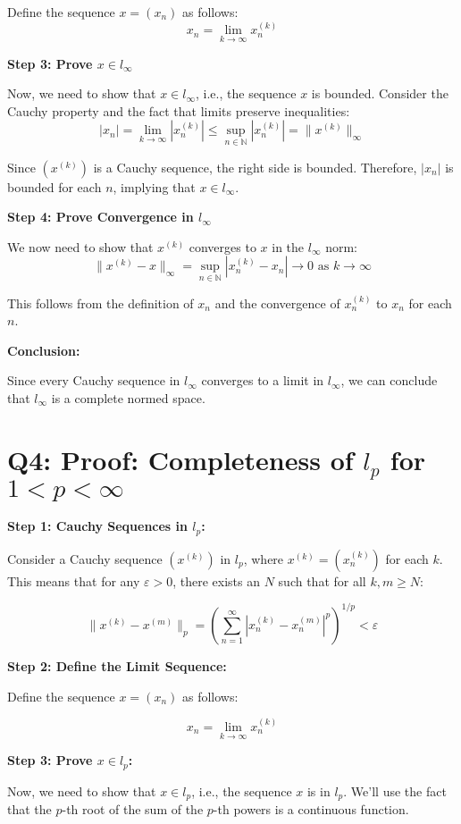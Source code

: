 \documentclass[12pt]{article}
\begin{document}
Define the sequence $x = (x_n)$ as follows:
\[ x_n = \lim_{k \to \infty} x_n^{(k)} \]

\textbf{Step 3: Prove $x \in l_\infty$}

Now, we need to show that $x \in l_\infty$, i.e., the sequence $x$ is bounded. Consider the Cauchy property and the fact that limits preserve inequalities:
\[ |x_n| = \lim_{k \to \infty} |x_n^{(k)}| \leq \sup_{n \in \mathbb{N}} |x_n^{(k)}| = \|x^{(k)}\|_\infty \]

Since $(x^{(k)})$ is a Cauchy sequence, the right side is bounded. Therefore, $|x_n|$ is bounded for each $n$, implying that $x \in l_\infty$.

\textbf{Step 4: Prove Convergence in $l_\infty$}

We now need to show that $x^{(k)}$ converges to $x$ in the $l_\infty$ norm:
\[ \|x^{(k)} - x\|_\infty = \sup_{n \in \mathbb{N}} |x_n^{(k)} - x_n| \to 0 \text{ as } k \to \infty \]

This follows from the definition of $x_n$ and the convergence of $x_n^{(k)}$ to $x_n$ for each $n$.

\textbf{Conclusion:}

Since every Cauchy sequence in $l_\infty$ converges to a limit in $l_\infty$, we can conclude that $l_\infty$ is a complete normed space.

\section{Q4: Proof: Completeness of \(l_p\) for \(1 < p < \infty\)}

\textbf{Step 1: Cauchy Sequences in \(l_p\):}

Consider a Cauchy sequence \((x^{(k)})\) in \(l_p\), where \(x^{(k)} = (x_n^{(k)})\) for each \(k\). This means that for any \(\varepsilon > 0\), there exists an \(N\) such that for all \(k, m \geq N\):

\[ \|x^{(k)} - x^{(m)}\|_p = \left( \sum_{n=1}^{\infty} |x_n^{(k)} - x_n^{(m)}|^p \right)^{1/p} < \varepsilon \]

\textbf{Step 2: Define the Limit Sequence:}

Define the sequence \(x = (x_n)\) as follows:

\[ x_n = \lim_{k \to \infty} x_n^{(k)} \]

\textbf{Step 3: Prove \(x \in l_p\):}

Now, we need to show that \(x \in l_p\), i.e., the sequence \(x\) is in \(l_p\). We'll use the fact that the \(p\)-th root of the sum of the \(p\)-th powers is a continuous function. 
\end{document}
